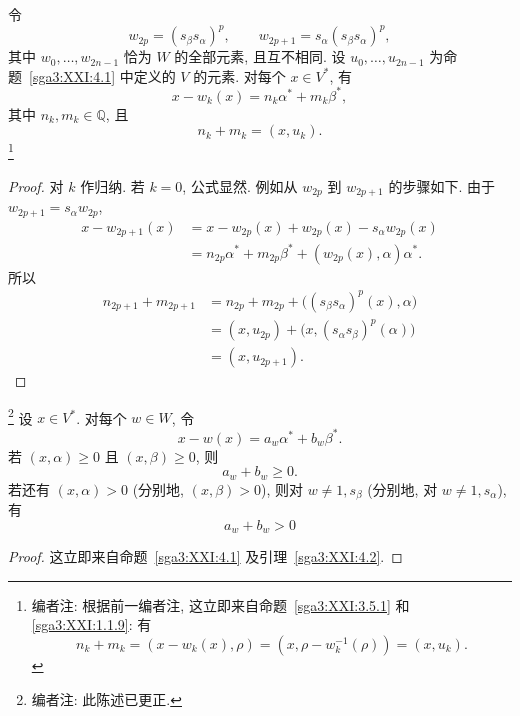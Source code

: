 \begin{lemma}\label{sga3:XXI:4.2}
令
\[
 w_{2p}=(s_\beta s_\alpha)^p,
 \qquad
 w_{2p+1}=s_\alpha(s_\beta s_\alpha)^p,
\]
其中 \(w_0,\ldots,w_{2n-1}\) 恰为 \(W\) 的全部元素, 且互不相同. 设 \(u_0,\ldots,u_{2n-1}\) 为命题~\ref{sga3:XXI:4.1} 中定义的 \(V\) 的元素. 对每个 \(x\in V^\ast\), 有
\[
 x-w_k(x)=n_k\alpha^\ast+m_k\beta^\ast,
\]
其中 \(n_k,m_k\in\mathbb Q\), 且
\[
 n_k+m_k=(x,u_k).
\]
\footnote{编者注: 根据前一编者注, 这立即来自命题~\ref{sga3:XXI:3.5.1} 和 \ref{sga3:XXI:1.1.9}: 有
\[
 n_k+m_k=(x-w_k(x),\rho)
 =(x,\rho-w_k^{-1}(\rho))=(x,u_k).
\]}
\end{lemma}
\begin{proof}
对 \(k\) 作归纳. 若 \(k=0\), 公式显然. 例如从 \(w_{2p}\) 到 \(w_{2p+1}\) 的步骤如下. 由于 \(w_{2p+1}=s_\alpha w_{2p}\),
\[
\begin{aligned}
x-w_{2p+1}(x)
 &=x-w_{2p}(x)+w_{2p}(x)-s_\alpha w_{2p}(x)\\
 &=n_{2p}\alpha^\ast+m_{2p}\beta^\ast
   +(w_{2p}(x),\alpha)\alpha^\ast.
\end{aligned}
\]
所以
\[
\begin{aligned}
n_{2p+1}+m_{2p+1}
 &=n_{2p}+m_{2p}
   +\bigl((s_\beta s_\alpha)^p(x),\alpha\bigr)\\
 &=(x,u_{2p})+\bigl(x,(s_\alpha s_\beta)^p(\alpha)\bigr)\\
 &=(x,u_{2p+1}).
\end{aligned}
\]
\end{proof}

\begin{corollary}\label{sga3:XXI:4.3}
\footnote{编者注: 此陈述已更正.}
设 \(x\in V^\ast\). 对每个 \(w\in W\), 令
\[
 x-w(x)=a_w\alpha^\ast+b_w\beta^\ast.
\]
若 \((x,\alpha)\ge0\) 且 \((x,\beta)\ge0\), 则
\[
 a_w+b_w\ge0.
\]
若还有 \((x,\alpha)>0\) (分别地, \((x,\beta)>0\)), 则对 \(w\ne1,s_\beta\) (分别地, 对 \(w\ne1,s_\alpha\)), 有
\[
 a_w+b_w>0
\]
\end{corollary}
\begin{proof}
这立即来自命题~\ref{sga3:XXI:4.1} 及引理~\ref{sga3:XXI:4.2}.
\end{proof}

